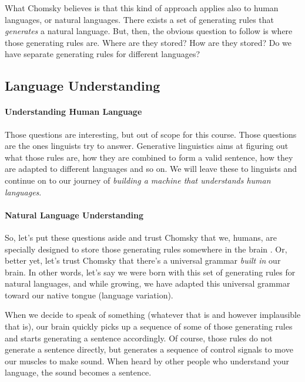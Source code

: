 \documentclass{report}
\begin{document}
What Chomsky believes is that this kind of approach applies also to human
languages, or natural languages. There exists a set of generating rules that
\emph{generates} a natural language. But, then, the obvious question to follow is
where those generating rules are. Where are they stored? How are they stored? Do
we have separate generating rules for different languages? 

\subsection{Language Understanding}
\label{sec:language_understanding_wrong}

\paragraph{Understanding Human Language}

Those questions are interesting, but out of scope for this course. Those
questions are the ones linguists try to answer. Generative linguistics aims at
figuring out what those rules are, how they are combined to form a valid
sentence, how they are adapted to different languages and so on. We will leave
these to linguists and continue on to our journey of \emph{building a machine
that understands human languages}. 

\paragraph{Natural Language Understanding}

So, let's put these questions aside and trust Chomsky that we, humans, are
specially designed to store those generating rules somewhere in the brain
\citep{chomsky1959review,carnie2013syntax}. Or, better yet, let's trust Chomsky
that there's a universal grammar \emph{built in} our brain. In other words, let's
say we were born with this set of generating rules for natural languages, and
while growing, we have adapted this universal grammar toward our native tongue
(language variation).

When we decide to speak of something (whatever that is and however implausible
that is), our brain quickly picks up a sequence of some of those generating
rules and starts generating a sentence accordingly. Of course, those rules do
not generate a sentence directly, but generates a sequence of control signals to
move our muscles to make sound. When heard by other people who understand your
language, the sound becomes a sentence.
\end{document}
